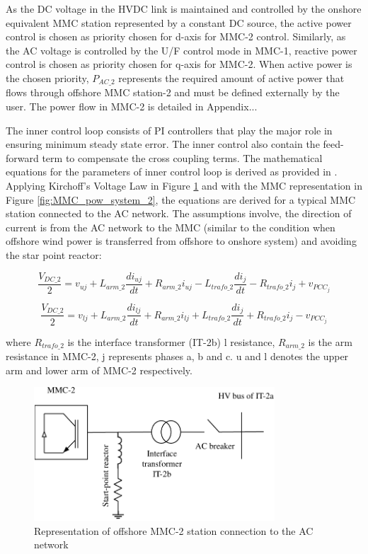 As the \gls{DC} voltage in the \gls{HVDC} link is maintained and controlled by the onshore equivalent \gls{MMC} station represented by a constant \gls{DC} source, the active power control is chosen as priority chosen for d-axis for \gls{MMC}-2 control. Similarly, as the \gls{AC} voltage is controlled by the U/F control mode in \gls{MMC}-1, reactive power control is chosen as priority chosen for q-axis for \gls{MMC}-2. When active power is the chosen priority, $P_{AC\_2}$ represents the required amount of active power that flows through offshore \gls{MMC} station-2 and must be defined externally by the user. The power flow in \gls{MMC}-2 is detailed in Appendix...  


The inner control loop consists of \gls{PI} controllers that play the major role in ensuring minimum steady state error. The inner control also contain the feed-forward term to compensate the cross coupling terms. The mathematical equations for the parameters of inner control loop is derived as provided in \cite{saad2015modelisation}. Applying Kirchoff's Voltage Law in Figure \ref{fig:MMC_pow_system_1} and with the \gls{MMC} representation in Figure \ref{fig:MMC_pow_system_2}, the equations are derived for a typical \gls{MMC} station connected to the \gls{AC} network. The assumptions involve, the direction of current is from the \gls{AC} network to the \gls{MMC} (similar to the condition when offshore wind power is transferred from offshore to onshore system) and avoiding the star point reactor:

\begin{equation}
    \frac{V_{DC\_2}}{2} = v_{uj} + L_{arm\_2}\frac{di_{uj}}{dt} + R_{arm\_2}i_{uj} - L_{trafo\_2}\frac{di_{j}}{dt} - R_{trafo\_2}i_j + v_{PCC}_j
\end{equation}

\begin{equation}
    \frac{V_{DC\_2}}{2} = v_{lj} + L_{arm\_2}\frac{di_{lj}}{dt} + R_{arm\_2}i_{lj} + L_{trafo\_2}\frac{di_{j}}{dt} + R_{trafo\_2}i_j - v_{PCC}_j
\end{equation}

where $R_{trafo\_2}$ is the interface transformer (IT-2b) l resistance, $R_{arm\_2}$ is the arm resistance in \gls{MMC}-2, j represents phases a, b and c. u and l denotes the upper arm and lower arm of \gls{MMC}-2 respectively.

\begin{figure}[H]
\centering
    \includegraphics[height = 5cm,width = 9cm]{Diagrams/Chapter_4/MMC_pow_system_1_new.pdf}
    \caption{Representation of offshore \gls{MMC}-2 station connection to the AC network \cite{saad2015modelisation}}
    \label{fig:MMC_pow_system_1}
\end{figure}

